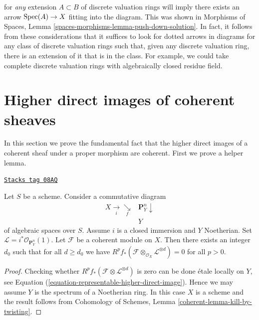 \begin{remark}
$$$$
for {\it any} extension $A \subset B$ of discrete valuation rings
will imply there exists an arrow $\operatorname{Spec}(A) \to X$ fitting into
the diagram. This was shown in
Morphisms of Spaces, Lemma \ref{spaces-morphisms-lemma-push-down-solution}.
In fact, it follows from these considerations that it suffices to look
for dotted arrows in diagrams for any class of discrete valuation rings
such that, given any discrete valuation ring, there is an extension of it
that is in the class. For example, we could take complete discrete valuation
rings with algebraically closed residue field.
\end{remark}

\section{Higher direct images of coherent sheaves}
\label{spaces-cohomology-section-proper-pushforward}
In this section we prove the fundamental fact that the higher
direct images of a coherent sheaf under a proper morphism
are coherent. First we prove a helper lemma.

\begin{lemma}
\label{spaces-cohomology-lemma-kill-by-twisting}
\href{https://stacks.math.columbia.edu/tag/08AQ}{\texttt{Stacks tag 08AQ}}

Let $S$ be a scheme. Consider a commutative diagram
$$
\begin{array}{cc}X \underset{i}{\longrightarrow}\underset{f}{\searrow} & \mathbf{P}^n_Y \downarrow \\  & Y\end{array}
$$
of algebraic spaces over $S$. Assume $i$ is a closed immersion
and $Y$ Noetherian. Set $\mathcal{L} = i^*\mathcal{O}_{\mathbf{P}^n_Y}(1)$.
Let $\mathcal{F}$ be a coherent module on $X$.
Then there exists an integer $d_0$ such that for all $d \geq d_0$ we have
$R^pf_*(\mathcal{F} \otimes_{\mathcal{O}_X} \mathcal{L}^{\otimes d}) = 0$
for all $p > 0$.
\end{lemma}

\begin{proof}
Checking whether $R^pf_*(\mathcal{F} \otimes \mathcal{L}^{\otimes d})$
is zero can be done \'etale locally on $Y$, see
Equation (\ref{equation-representable-higher-direct-image}).
Hence we may assume $Y$ is the spectrum of a Noetherian ring. In this case
$X$ is a scheme and the result follows from
Cohomology of Schemes, Lemma \ref{coherent-lemma-kill-by-twisting}.
\end{proof}

